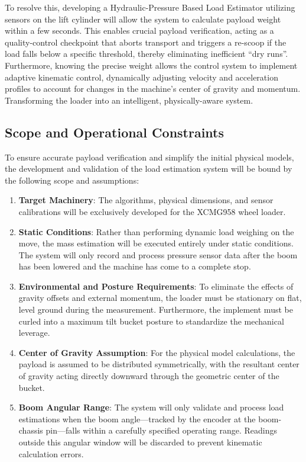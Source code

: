 \documentclass[12pt, a4paper]{article}
\begin{document}
To resolve this, developing a Hydraulic-Pressure Based Load Estimator utilizing sensors on the lift cylinder will allow the system to calculate payload weight within a few seconds. This enables crucial payload verification, acting as a quality-control checkpoint that aborts transport and triggers a re-scoop if the load falls below a specific threshold, thereby eliminating inefficient ``dry runs''. Furthermore, knowing the precise weight allows the control system to implement adaptive kinematic control, dynamically adjusting velocity and acceleration profiles to account for changes in the machine's center of gravity and momentum. Transforming the loader into an intelligent, physically-aware system.

\subsection{Scope and Operational Constraints}
To ensure accurate payload verification and simplify the initial physical models, the development and validation of the load estimation system will be bound by the following scope and assumptions:
\begin{enumerate}
    \item \textbf{Target Machinery}: The algorithms, physical dimensions, and sensor calibrations will be exclusively developed for the XCMG958 wheel loader.
    \item \textbf{Static Conditions}: Rather than performing dynamic load weighing on the move, the mass estimation will be executed entirely under static conditions. The system will only record and process pressure sensor data after the boom has been lowered and the machine has come to a complete stop.
    \item \textbf{Environmental and Posture Requirements}: To eliminate the effects of gravity offsets and external momentum, the loader must be stationary on flat, level ground during the measurement. Furthermore, the implement must be curled into a maximum tilt bucket posture to standardize the mechanical leverage.
    \item \textbf{Center of Gravity Assumption}: For the physical model calculations, the payload is assumed to be distributed symmetrically, with the resultant center of gravity acting directly downward through the geometric center of the bucket.
    \item \textbf{Boom Angular Range}: The system will only validate and process load estimations when the boom angle—tracked by the encoder at the boom-chassis pin—falls within a carefully specified operating range. Readings outside this angular window will be discarded to prevent kinematic calculation errors.
\end{enumerate}
\end{document}
